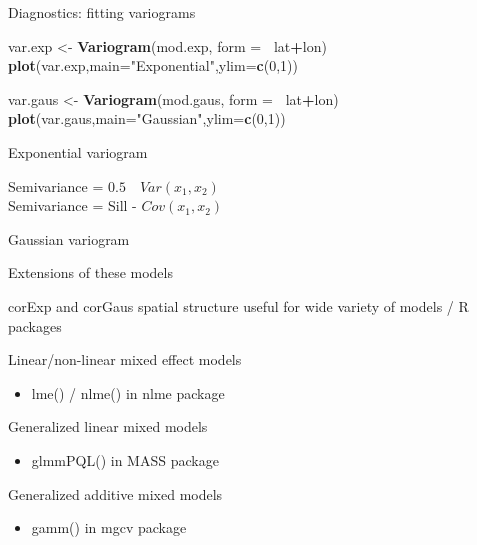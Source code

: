 \documentclass[ignorenonframetext,]{beamer}
\newenvironment{Shaded}{\begin{snugshade}}{\end{snugshade}}
\newcommand{\DataTypeTok}[1]{\textcolor[rgb]{0.13,0.29,0.53}{#1}}
\newcommand{\DecValTok}[1]{\textcolor[rgb]{0.00,0.00,0.81}{#1}}
\newcommand{\KeywordTok}[1]{\textcolor[rgb]{0.13,0.29,0.53}{\textbf{#1}}}
\newcommand{\NormalTok}[1]{#1}
\newcommand{\OperatorTok}[1]{\textcolor[rgb]{0.81,0.36,0.00}{\textbf{#1}}}
\newcommand{\StringTok}[1]{\textcolor[rgb]{0.31,0.60,0.02}{#1}}
\providecommand{\tightlist}{%
  \setlength{\itemsep}{0pt}\setlength{\parskip}{0pt}}
\begin{document}
\begin{frame}[fragile]{Diagnostics: fitting variograms}
\protect\hypertarget{diagnostics-fitting-variograms}{}

\begin{Shaded}
\begin{Highlighting}[]
\NormalTok{var.exp <-}\StringTok{ }\KeywordTok{Variogram}\NormalTok{(mod.exp, }\DataTypeTok{form =}\OperatorTok{~}\StringTok{ }\NormalTok{lat}\OperatorTok{+}\NormalTok{lon)}
\KeywordTok{plot}\NormalTok{(var.exp,}\DataTypeTok{main=}\StringTok{"Exponential"}\NormalTok{,}\DataTypeTok{ylim=}\KeywordTok{c}\NormalTok{(}\DecValTok{0}\NormalTok{,}\DecValTok{1}\NormalTok{))}

\NormalTok{var.gaus <-}\StringTok{ }\KeywordTok{Variogram}\NormalTok{(mod.gaus, }\DataTypeTok{form =}\OperatorTok{~}\StringTok{ }\NormalTok{lat}\OperatorTok{+}\NormalTok{lon)}
\KeywordTok{plot}\NormalTok{(var.gaus,}\DataTypeTok{main=}\StringTok{"Gaussian"}\NormalTok{,}\DataTypeTok{ylim=}\KeywordTok{c}\NormalTok{(}\DecValTok{0}\NormalTok{,}\DecValTok{1}\NormalTok{))}
\end{Highlighting}
\end{Shaded}

\end{frame}

\begin{frame}{Exponential variogram}
\protect\hypertarget{exponential-variogram}{}

Semivariance = \(0.5 \quad Var({x}_{1},{x}_{2})\)\\
Semivariance = Sill - \(Cov({x}_{1},{x}_{2})\)

\end{frame}

\begin{frame}{Gaussian variogram}
\protect\hypertarget{gaussian-variogram}{}

\end{frame}

\begin{frame}{Extensions of these models}
\protect\hypertarget{extensions-of-these-models}{}

corExp and corGaus spatial structure useful for wide variety of models /
R packages

Linear/non-linear mixed effect models

\begin{itemize}
\tightlist
\item
  lme() / nlme() in nlme package
\end{itemize}

Generalized linear mixed models

\begin{itemize}
\tightlist
\item
  glmmPQL() in MASS package
\end{itemize}

Generalized additive mixed models

\begin{itemize}
\tightlist
\item
  gamm() in mgcv package
\end{itemize}

\end{frame}
\end{document}
